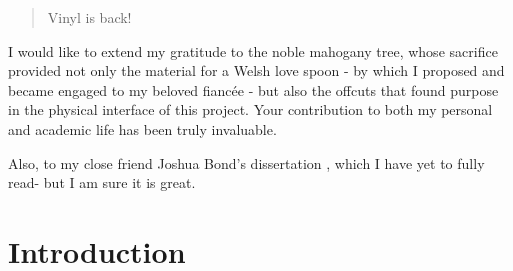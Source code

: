   \begin{abstract} %
      Vinyl is back!
  
  \end{abstract}%
  \clearpage
  
  
  
  \uomdeclarations %
  
  
  
  \begin{uomacknowledgements}
  I would like to extend my gratitude to the noble mahogany tree, whose sacrifice provided not only the material for a Welsh love spoon - by which I proposed and became engaged to my beloved fiancée - but also the offcuts that found purpose in the physical interface of this project. Your contribution to both my personal and academic life has been truly invaluable.
  
  Also, to my close friend Joshua Bond’s dissertation \cite{jdbond}, which I have yet to fully read- but I am sure it is great.
  \end{uomacknowledgements}
  
  
  
  \section{Introduction}
  
  
  
